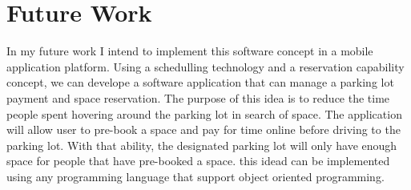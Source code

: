 \chapter{Future Work}
In my future work I intend to implement this software concept in a mobile application platform. Using a schedulling technology and a reservation capability concept, we can develope a software application that can manage a parking lot payment and space reservation. The purpose of this idea is to reduce the time people spent hovering around the parking lot in search of space. The application will allow user to pre-book a space and pay for time online before driving to the parking lot. With that ability, the designated parking lot will only have enough space for people that have pre-booked a space. this idead can be implemented using any programming language that support object oriented programming.  
\label{chap:refs}
